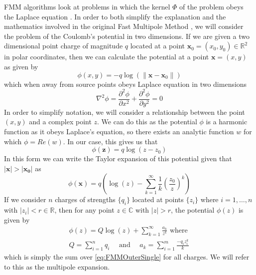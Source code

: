 FMM algorithms look at problems in which the kernel $\Phi$ of the problem obeys the Laplace equation \cite{Beatson}. In order to both simplify the explanation and the mathematics involved in the original Fast Multipole Method \cite{Greengard1987ASimulations} , we will consider the problem of the Coulomb's potential in two dimensions. If we are given a two dimensional point charge of magnitude $q$ located at a point $\bm{x}_0 = (x_0,y_0) \in \mathbb{R}^2$ in polar coordinates, then we can calculate the potential at a point $\bm{x} = (x,y)$ as given by
\begin{equation*}
    \phi(x,y) = -q\log(\lVert \bm{x} - \bm{x}_0 \rVert)
\end{equation*}
which when away from source points obeys Laplace equation in two dimensions
\begin{equation*}
    \nabla^2 \phi = \frac{\partial^2 \phi}{\partial x^2} + \frac{\partial^2 \phi}{\partial y^2} = 0
\end{equation*}
In order to simplify notation, we will consider a relationship between the point $(x,y)$ and a complex point $z$. We can do this as the potential $\phi$ is a harmonic function as it obeys Laplace's equation, so there exists an analytic function $w$ for which $\phi = Re(w)$. In our case, this gives us that 
\begin{equation*}
    \phi(\bm{z}) = q\log(z-z_0)
\end{equation*}
In this form we can write the Taylor expansion of this potential given that $|\bm{x}|>|\bm{x_0}|$ as 
\begin{equation}
\label{eq:FMMOuterSingle}
    \phi(\bm{x}) = q\left( \log(z) - \sum_{k=1}^{\infty} \frac{1}{k}\left( \frac{z_0}{z} \right)^k \right)
\end{equation}
If we consider $n$ charges of strengths $\{q_i\}$ located at points $\{z_i\}$ where $i=1,\dots,n$ with $|z_i|<r\in\mathbb{R}$, then for any point $z\in\mathbb{C}$ with $|z|>r$, the potential $\phi(z)$ is given by
\begin{equation}
\label{eq:FMMOuterMulti}
\begin{gathered}
    \phi(z) = Q\log(z) + \sum_{k=1}^\infty \frac{a_k}{z^k} \text{ where }\\
    Q = \sum_{i=1}^n q_i \quad \text{ and } \quad a_k = \sum_{i=1}^{m} \frac{-q_i z_i^k}{k}
\end{gathered}
\end{equation}
which is simply the sum over \cref{eq:FMMOuterSingle} for all charges. We will refer to this as the multipole expansion. 

